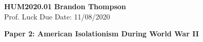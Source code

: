 \noindent
\textbf{HUM2020.01} \hfill \textbf{Brandon Thompson} \\
\normalsize Prof. Luck \hfill Due Date: 11/08/2020 \\

\begin{center}
\textbf{Paper 2: American Isolationism During World War II}
\end{center}
